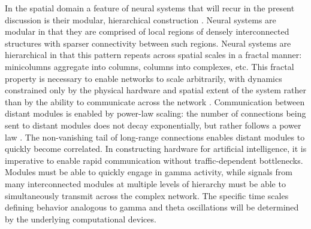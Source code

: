 \documentclass[twocolumn]{article}
\begin{document}
In the spatial domain a feature of neural systems that will recur in the present discussion is their modular, hierarchical construction \cite{sp2010,mela2010,beba2017,khma2018}. Neural systems are modular in that they are comprised of local regions of densely interconnected structures with sparser connectivity between such regions. Neural systems are hierarchical in that this pattern repeats across spatial scales in a fractal manner: minicolumns aggregate into columns, columns into complexes, etc. This fractal property is necessary to enable networks to scale arbitrarily, with dynamics constrained only by the physical hardware and spatial extent of the system rather than by the ability to communicate across the network \cite{plth2006}. Communication between distant modules is enabled by power-law scaling: the number of connections being sent to distant modules does not decay exponentially, but rather follows a power law \cite{bagr2010,spte2016}. The non-vanishing tail of long-range connections enables distant modules to quickly become correlated. In constructing hardware for artificial intelligence, it is imperative to enable rapid communication without traffic-dependent bottlenecks. Modules must be able to quickly engage in gamma activity, while signals from many interconnected modules at multiple levels of hierarchy must be able to simultaneously transmit across the complex network. The specific time scales defining behavior analogous to gamma and theta oscillations will be determined by the underlying computational devices.
\end{document}
